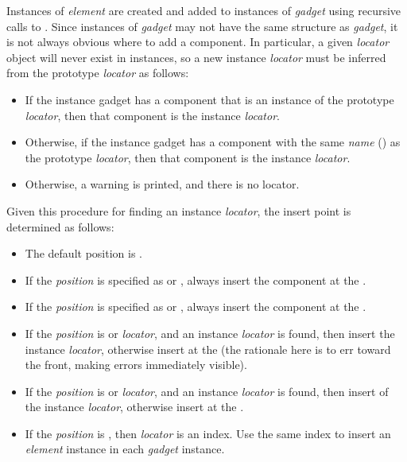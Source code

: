 Instances of {\it element} are created and added to instances of {\it gadget}
using recursive calls to .  Since instances of
{\it gadget} may not have the same structure as {\it gadget},
it is not always obvious where to add a component.
In particular, a given {\it locator} object will never exist
in instances, so a new instance {\it locator} must be inferred from
the prototype {\it locator} as follows:
\begin{itemize}
\item If the instance gadget has a component that is an instance of the
prototype {\it locator}, then that component is the instance {\it locator}.

\item Otherwise, if the instance gadget has a component with the same
{\it name} () as the prototype {\it locator}, then that
component is the instance {\it locator}.

\item Otherwise, a warning is printed, and there is no locator.
\end{itemize}

Given this procedure for finding an instance {\it locator},
the insert point is determined as follows:
\begin{itemize}
\item The default position is .

\item If the {\it position} is specified as  or , always insert
the component at the .

\item If the {\it position} is specified as  or , always insert
the component at the .

\item If the {\it position} is  or  {\it locator}, and
an instance {\it locator} is found, then insert  the instance
{\it locator}, otherwise insert at the  (the rationale here
is to err toward the front, making errors immediately visible).

\item If the {\it position} is  or  {\it locator}, and
an instance {\it locator} is found, then insert  of the instance
{\it locator}, otherwise insert at the .

\item If the {\it position} is , then {\it locator} is an index.  Use
the same index to insert an {\it element} instance in each {\it gadget}
instance.
\end{itemize}

